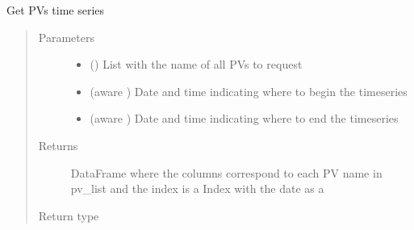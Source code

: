 \documentclass[letterpaper,10pt,english]{sphinxmanual}
\begin{document}
\begin{fulllineitems}
\label{\detokenize{epics_requests:epics_requests.call_fetch}}
\sphinxAtStartPar
Get PVs time series
\begin{quote}\begin{description}
\item[{Parameters}] \leavevmode\begin{itemize}
\item {} 
\sphinxAtStartPar
{} () \textendash{} List with the name of all PVs to request

\item {} 
\sphinxAtStartPar
{} (aware ) \textendash{} Date and time indicating where to begin the timeseries

\item {} 
\sphinxAtStartPar
{} (aware ) \textendash{} Date and time indicating where to end the timeseries

\end{itemize}

\item[{Returns}] \leavevmode
\sphinxAtStartPar
DataFrame where the columns correspond to each PV name in pv\_list and the index is a Index with the date as a 

\item[{Return type}] \leavevmode
\sphinxAtStartPar
{}

\end{description}\end{quote}

\end{fulllineitems}

\end{document}
